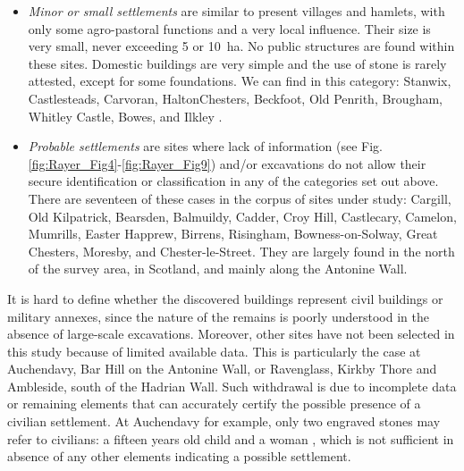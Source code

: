 \begin{itemize}
	\item \emph{Minor or small settlements} are similar to present villages and hamlets, with only some agro-pastoral functions and a very local influence. Their size is very small, never exceeding 5 or \SI{10}{\hectare}. No public structures are found within these sites. Domestic buildings are very simple and the use of stone is rarely attested, except for some foundations. We can find in this category: Stanwix, Castlesteads, Carvoran, HaltonChesters, Beckfoot, Old Penrith, Brougham, Whitley Castle, Bowes, and Ilkley \parencites[see for instance][121]{Casey_1998}[124--127]{Hodgson_2009}.
	\item \emph{Probable settlements} are sites where lack of information (see Fig. \ref{fig:Rayer_Fig4}-\ref{fig:Rayer_Fig9}) and/or excavations do not allow their secure identification or classification in any of the categories set out above. There are seventeen of these cases in the corpus of sites under study: Cargill, Old Kilpatrick, Bearsden, Balmuildy, Cadder, Croy Hill, Castlecary, Camelon, Mumrills, Easter Happrew, Birrens, Risingham, Bowness-on-Solway, Great Chesters, Moresby, and Chester-le-Street. They are largely found in the north of the survey area, in Scotland, and mainly along the Antonine Wall. 
\end{itemize}

It is hard to define whether the discovered buildings represent civil buildings or military annexes, since the nature of the remains is poorly understood in the absence of large-scale excavations. Moreover, other sites have not been selected in this study because of limited available data. This is particularly the case at Auchendavy, Bar Hill on the Antonine Wall, or Ravenglass, Kirkby Thore and Ambleside, south of the Hadrian Wall. Such withdrawal is due to incomplete data or remaining elements that can accurately certify the possible presence of a civilian settlement. At Auchendavy for example, only two engraved stones may refer to civilians: a fifteen years old child \parencite[2182]{RIB_1965} and a woman \parencite[2183]{RIB_1965}, which is not sufficient in absence of any other elements indicating a possible settlement.
	

